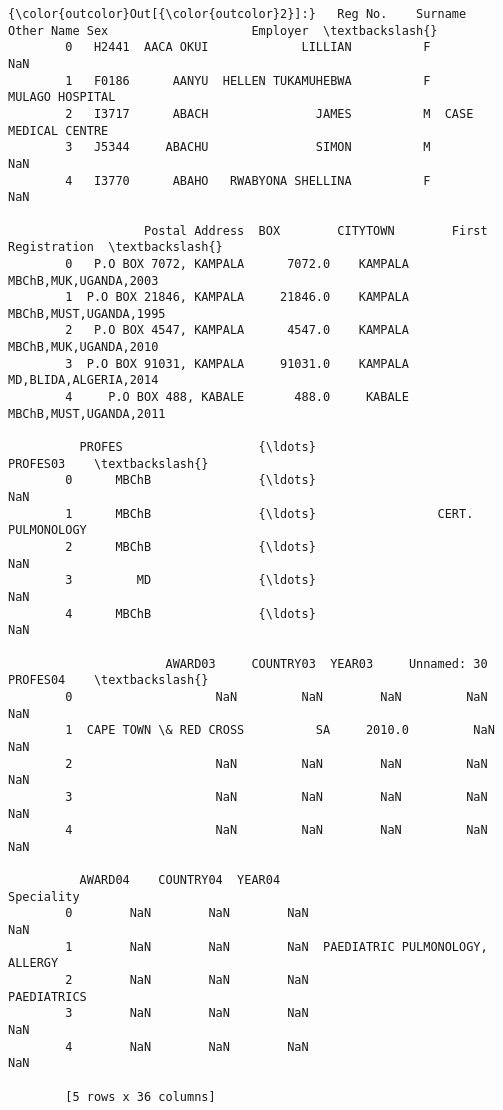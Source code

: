 \documentclass[11pt]{article}
\begin{document}
\begin{Verbatim}[commandchars=\\\{\}]
{\color{outcolor}Out[{\color{outcolor}2}]:}   Reg No.    Surname          Other Name Sex                    Employer  \textbackslash{}
        0   H2441  AACA OKUI             LILLIAN          F                  NaN   
        1   F0186      AANYU  HELLEN TUKAMUHEBWA          F      MULAGO HOSPITAL   
        2   I3717      ABACH               JAMES          M  CASE MEDICAL CENTRE   
        3   J5344     ABACHU               SIMON          M                  NaN   
        4   I3770      ABAHO   RWABYONA SHELLINA          F                  NaN   
        
                   Postal Address  BOX        CITYTOWN        First Registration  \textbackslash{}
        0   P.O BOX 7072, KAMPALA      7072.0    KAMPALA   MBChB,MUK,UGANDA,2003   
        1  P.O BOX 21846, KAMPALA     21846.0    KAMPALA  MBChB,MUST,UGANDA,1995   
        2   P.O BOX 4547, KAMPALA      4547.0    KAMPALA   MBChB,MUK,UGANDA,2010   
        3  P.O BOX 91031, KAMPALA     91031.0    KAMPALA   MD,BLIDA,ALGERIA,2014   
        4     P.O BOX 488, KABALE       488.0     KABALE  MBChB,MUST,UGANDA,2011   
        
          PROFES                   {\ldots}                        PROFES03    \textbackslash{}
        0      MBChB               {\ldots}                               NaN   
        1      MBChB               {\ldots}                 CERT. PULMONOLOGY   
        2      MBChB               {\ldots}                               NaN   
        3         MD               {\ldots}                               NaN   
        4      MBChB               {\ldots}                               NaN   
        
                      AWARD03     COUNTRY03  YEAR03     Unnamed: 30 PROFES04    \textbackslash{}
        0                    NaN         NaN        NaN         NaN        NaN   
        1  CAPE TOWN \& RED CROSS          SA     2010.0         NaN        NaN   
        2                    NaN         NaN        NaN         NaN        NaN   
        3                    NaN         NaN        NaN         NaN        NaN   
        4                    NaN         NaN        NaN         NaN        NaN   
        
          AWARD04    COUNTRY04  YEAR04                           Speciality  
        0        NaN        NaN        NaN                              NaN  
        1        NaN        NaN        NaN  PAEDIATRIC PULMONOLOGY, ALLERGY  
        2        NaN        NaN        NaN                      PAEDIATRICS  
        3        NaN        NaN        NaN                              NaN  
        4        NaN        NaN        NaN                              NaN  
        
        [5 rows x 36 columns]
\end{Verbatim}
            
\end{document}
